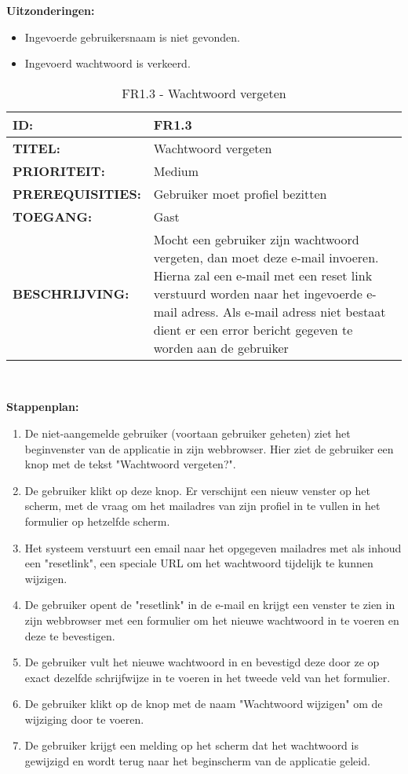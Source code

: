 \textbf{Uitzonderingen:}
\begin{itemize}
\item Ingevoerde gebruikersnaam is niet gevonden.
\item Ingevoerd wachtwoord is verkeerd.
\end{itemize}


\noindent\begin{table}[H]
            \begin{tabular}{l | p{10cm}}
                \textbf{ID:} & FR1.3 \\ \hline
                \textbf{TITEL:} & Wachtwoord vergeten \\ \hline
                \textbf{PRIORITEIT:} &  Medium \\ \hline
                \textbf{PREREQUISITIES:} & Gebruiker moet profiel bezitten\\ \hline
                \textbf{TOEGANG:} &  Gast \\ \hline
                \textbf{BESCHRIJVING:} & Mocht een gebruiker zijn wachtwoord vergeten, dan moet deze e-mail invoeren. 
                                        Hierna zal een e-mail met een reset link verstuurd worden naar het ingevoerde e-mail adress. 
                                        Als e-mail adress niet bestaat dient er een error bericht gegeven te worden aan de gebruiker\\
            \end{tabular}\\
            \caption{FR1.3 - Wachtwoord vergeten}
            \label{tab:FR1.3 - Wachtwoord vergeten}
        \end{table}

\textbf{Stappenplan:}
\begin{enumerate}
\item De niet-aangemelde gebruiker (voortaan gebruiker geheten) ziet het beginvenster van de applicatie in zijn webbrowser. Hier ziet de gebruiker een knop met de tekst "Wachtwoord vergeten?".
\item De gebruiker klikt op deze knop. Er verschijnt een nieuw venster op het scherm, met de vraag om het mailadres van zijn profiel in te vullen in het formulier op hetzelfde scherm.
\item Het systeem verstuurt een email naar het opgegeven mailadres met als inhoud een "resetlink", een speciale URL om het wachtwoord tijdelijk te kunnen wijzigen.
\item De gebruiker opent de "resetlink" in de e-mail en krijgt een venster te zien in zijn webbrowser met een formulier om het nieuwe wachtwoord in te voeren en deze te bevestigen.
\item De gebruiker vult het nieuwe wachtwoord in en bevestigd deze door ze op exact dezelfde schrijfwijze in te voeren in het tweede veld van het formulier.
\item De gebruiker klikt op de knop met de naam "Wachtwoord wijzigen" om de wijziging door te voeren.
\item De gebruiker krijgt een melding op het scherm dat het wachtwoord is gewijzigd en wordt terug naar het beginscherm van de applicatie geleid.
\end{enumerate}

